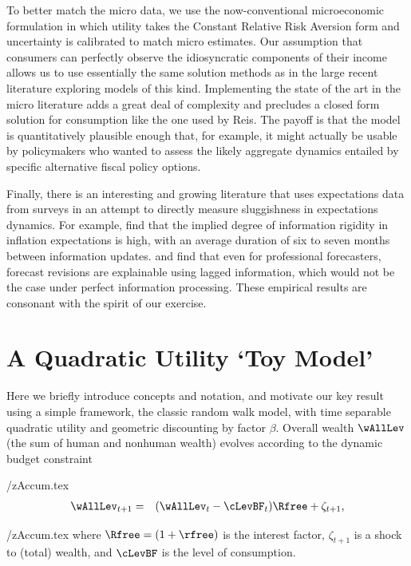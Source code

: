 \documentclass[titlepage]{\econtex}
\begin{document}
To better match the micro data, we use the now-conventional microeconomic formulation in which utility takes the Constant Relative Risk Aversion form and uncertainty is calibrated to match micro estimates.  Our assumption that consumers can perfectly observe the idiosyncratic components of their income allows us to use essentially the same solution methods as in the large recent literature exploring models of this kind.
Implementing the state of the art in the micro literature adds a great deal of complexity and precludes a closed form solution for consumption like the one used by Reis. The payoff is that the model is quantitatively plausible enough that, for example, it might actually be usable by policymakers who wanted to assess the likely aggregate dynamics entailed by specific alternative fiscal policy options.

Finally, there is an interesting and growing literature that uses expectations data from surveys in an attempt to directly measure sluggishness in expectations dynamics.
For example, \cite{coibGor:AER15} find that the implied degree of information rigidity in inflation expectations is high, with an average duration of six to seven months between information updates. \cite{fuhrer:JME17} and \cite{fuhrerIntrinsicPersistence} find that even for professional forecasters, forecast revisions are explainable using lagged information, which would not be the case under perfect information processing.  These empirical results are consonant with the spirit of our exercise.

\hypertarget{Quadratic}{}
\section{A Quadratic Utility `Toy Model'}\label{sec:Quadratic}

Here we briefly introduce concepts and notation, and motivate our key result using a simple framework, the classic \cite{hallRandomWalk} random walk model, with time separable quadratic utility and geometric discounting by factor $\beta$.  Overall wealth $\wAllLev$ (the sum of human and nonhuman wealth) evolves according to the dynamic budget constraint
\begin{verbatimwrite}{\eq/zAccum.tex}
\begin{eqnarray}
  \wAllLev_{t+1} & = & (\wAllLev_{t}-\cLevBF_{t})\Rfree+\zeta_{t+1}, \label{eq:zAccum}
\end{eqnarray}
\end{verbatimwrite}
 \eq/zAccum.tex
where $\Rfree=(1+\rfree)$ is the interest factor, $\zeta_{t+1}$ is a shock to (total) wealth, and $\cLevBF$ is the level of consumption.
\end{document}
